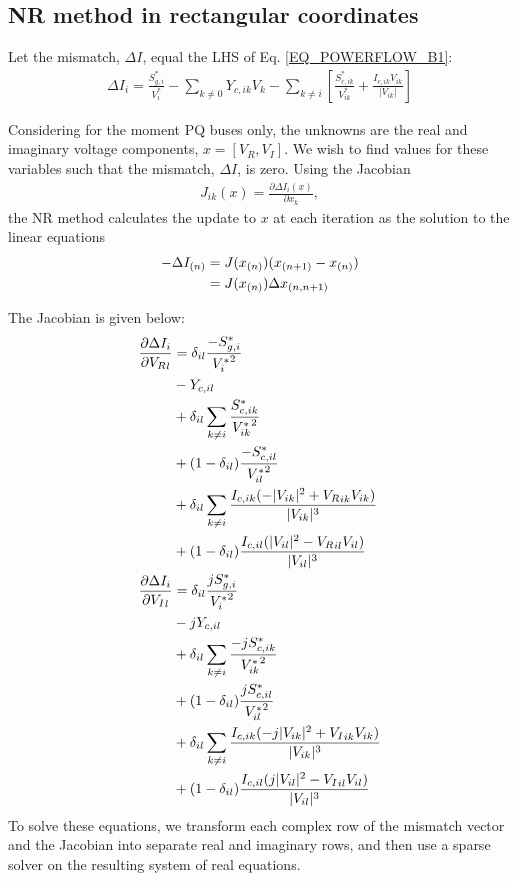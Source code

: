 \documentclass[10pt]{article}
\newcommand{\Vr}{{V_R}}
\newcommand{\Vi}{{V_I}}
\begin{document}
\subsection{NR method in rectangular coordinates}
Let the mismatch, $\Delta I$, equal the LHS of Eq. \ref{EQ_POWERFLOW_B1}:
\begin{align}
\Delta I_i = \frac{S^*_{g,i}}{V^*_i} - \sum_{k \ne 0}{Y_{c,ik}V_{k}} - \sum_{k \ne i}\left[\frac{S^*_{c,ik}}{V^*_{ik}} + \frac{I_{c,ik}V_{ik}}{|V_{ik}|}\right]
\label{EQ_MISMATCH}
\end{align}

Considering for the moment PQ buses only, the unknowns are the real and imaginary voltage components, $x = [\Vr, \Vi]$. We wish to find values for these variables such that the mismatch, $\Delta I$, is zero. Using the Jacobian
\begin{align}
J_{ik}(x) = \frac{\partial \Delta I_i(x)}{\partial x_k},
\end{align}
the NR method calculates the update to $x$ at each iteration as the solution to the linear equations
\begin{align}
-\Delta I_{(n)} &= J(x_{(n)})(x_{(n+1)}-x_{(n)}) \notag \\
                &= J(x_{(n)})\Delta x_{(n,n+1)}
\label{EQ_NR}
\end{align}

The Jacobian is given below:
\begin{align}
	\frac{\partial \Delta I_i}{\partial \Vr_l} 
		&= \delta_{il}\frac{-S^*_{g,i}}{{V^*_i}^2} \notag \\
		&- Y_{c,il} \notag \\
		&+ \delta_{il} \sum_{k \ne i}{\frac{S^*_{c,ik}}{{V^*_{ik}}^2}} \notag \\
		&+ (1-\delta_{il})\frac{-S^*_{c,il}}{{V^*_{il}}^2} \notag \\
		&+ \delta_{il} \sum_{k \ne i}{\frac{I_{c,ik}(-|V_{ik}|^2 + \Vr_{ik}V_{ik})}{|V_{ik}|^3}} \notag \\
		&+ (1 - \delta_{il})\frac{I_{c,il}(|V_{il}|^2 - \Vr_{il}V_{il})}{|V_{il}|^3} \notag \\
	\frac{\partial \Delta I_i}{\partial \Vi_l} 
		&= \delta_{il}\frac{j S^*_{g,i}}{{V^*_i}^2} \notag \\
		&- j Y_{c,il} \notag \\
		&+ \delta_{il} \sum_{k \ne i}{\frac{-j S^*_{c,ik}}{{V^*_{ik}}^2}} \notag \\
		&+ (1-\delta_{il}) \frac{j S^*_{c,il}}{{V^*_{il}}^2} \notag \\
		&+ \delta_{il} \sum_{k \ne i}{\frac{I_{c,ik}(-j|V_{ik}|^2 + \Vi_{ik}V_{ik})}{|V_{ik}|^3}} \notag \\
		&+ (1 - \delta_{il})\frac{I_{c,il}(j|V_{il}|^2 - \Vi_{il}V_{il})}{|V_{il}|^3}	
\end{align}
To solve these equations, we transform each complex row of the mismatch vector and the Jacobian into separate real and imaginary rows, and then use a sparse solver on the resulting system of real equations.
\end{document}
